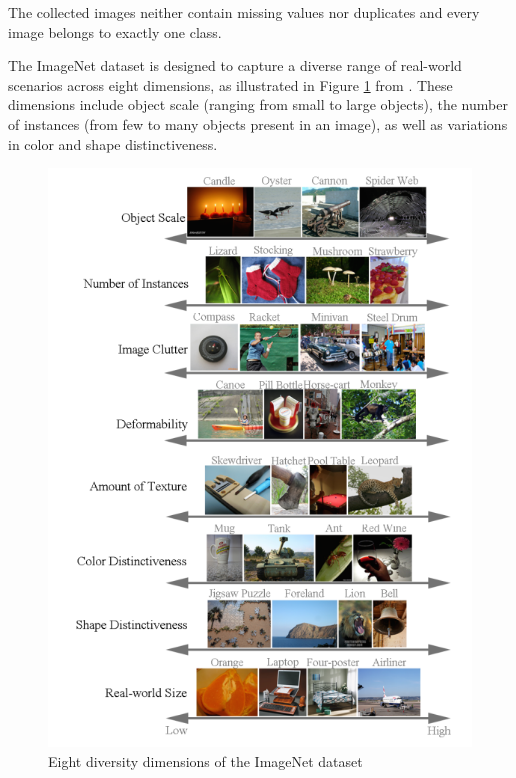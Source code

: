 \documentclass[10pt,a4paper,twoside]{article}
\begin{document}
    The collected images neither contain missing values nor duplicates and every image belongs to exactly one class.

    The ImageNet dataset is designed to capture a diverse range of real-world scenarios across eight dimensions, as illustrated in Figure \ref{fig:imnet_dimensions} from \cite{imagenet_breakdown}. These dimensions include object scale (ranging from small to large objects), the number of instances (from few to many objects present in an image), as well as variations in color and shape distinctiveness.

   \begin{figure}
        \centering
        \includegraphics[width=\textwidth]{../../sample_images/imnet_dimension.png}
        \caption{Eight diversity dimensions of the ImageNet dataset \cite{imagenet_breakdown}}
        \label{fig:imnet_dimensions}
   \end{figure}
\end{document}
